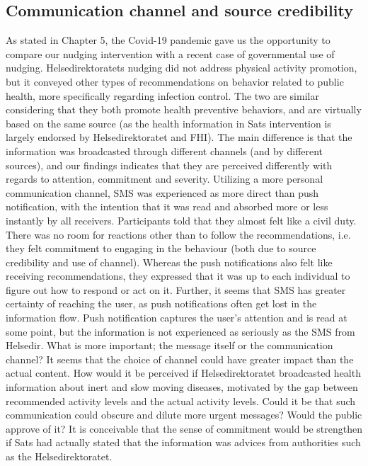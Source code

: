 \subsection{Communication channel and source credibility}
As stated in Chapter 5, the Covid-19 pandemic gave us the opportunity to compare our nudging intervention with a recent case of governmental use of nudging. Helsedirektoratets nudging did not address physical activity promotion, but it conveyed other types of recommendations on behavior related to public health, more specifically regarding infection control. The two are similar considering that they both promote health preventive behaviors, and are virtually based on the same source (as the health information in Sats intervention is largely endorsed by Helsedirektoratet and FHI). The main difference is that the information was broadcasted through different channels (and by different sources), and our findings indicates that they are perceived differently with regards to attention, commitment and severity. Utilizing a more personal communication channel, SMS was experienced as more direct than push notification, with the intention that it was read and absorbed more or less instantly by all receivers. Participants told that they almost felt like a civil duty. There was no room for reactions other than to follow the recommendations, i.e. they felt commitment to engaging in the behaviour (both due to source credibility and use of channel). Whereas the push notifications also felt like receiving recommendations, they expressed that it was up to each individual to figure out how to respond or act on it. Further, it seems that SMS has greater certainty of reaching the user, as push notifications often get lost in the information flow. Push notification captures the user's attention and is read at some point, but the information is not experienced as seriously as the SMS from Helsedir. What is more important; the message itself or the communication channel? It seems that the choice of channel could have greater impact than the actual content. How would it be perceived if Helsedirektoratet broadcasted health information about inert and slow moving diseases, motivated by the gap between recommended activity levels and the actual activity levels. Could it be that such communication could obscure and dilute more urgent messages? Would the public approve of it? It is conceivable that the sense of commitment would be strengthen if Sats had actually stated that the information was advices from authorities such as the Helsedirektoratet. 

